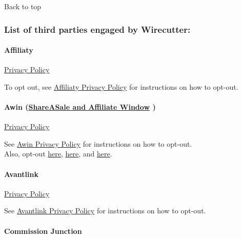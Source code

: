 Back to top

\hypertarget{list-of-third-parties-engaged-by-wirecutter}{%
\subsubsection{List of third parties engaged by
Wirecutter:}\label{list-of-third-parties-engaged-by-wirecutter}}

\hypertarget{affiliaty}{%
\paragraph{Affiliaty}\label{affiliaty}}

\href{https://www.affiliatly.com/legal-privacy}{Privacy Policy}

To opt out, see
\href{https://www.affiliatly.com/legal-privacy}{Affiliaty Privacy
Policy} for instructions on how to opt-out.

\hypertarget{awin-shareasale-and-affiliate-window-}{%
\paragraph{\texorpdfstring{Awin
(\href{https://www.sizmek.com/privacy-policy/}{ShareASale and Affiliate
Window}
)}{Awin (ShareASale and Affiliate Window )}}\label{awin-shareasale-and-affiliate-window-}}

\href{https://www.awin.com/gb/legal/privacy-policy-gb}{Privacy Policy}

See \href{https://www.awin.com/gb/legal/privacy-policy-gb}{Awin Privacy
Policy} for instructions on how to opt-out.\\
Also, opt-out \href{https://www.youronlinechoices.com/}{here},
\href{http://meine-cookies.org/DDOW/}{here}, and
\href{http://www.aboutads.info/choices/}{here}.

\hypertarget{avantlink}{%
\paragraph{Avantlink}\label{avantlink}}

\href{https://www.avantlink.com/privacy}{Privacy Policy}

See \href{https://www.avantlink.com/privacy}{Avantlink Privacy Policy}
for instructions on how to opt-out.

\hypertarget{commission-junction}{%
\paragraph{Commission Junction}\label{commission-junction}}

